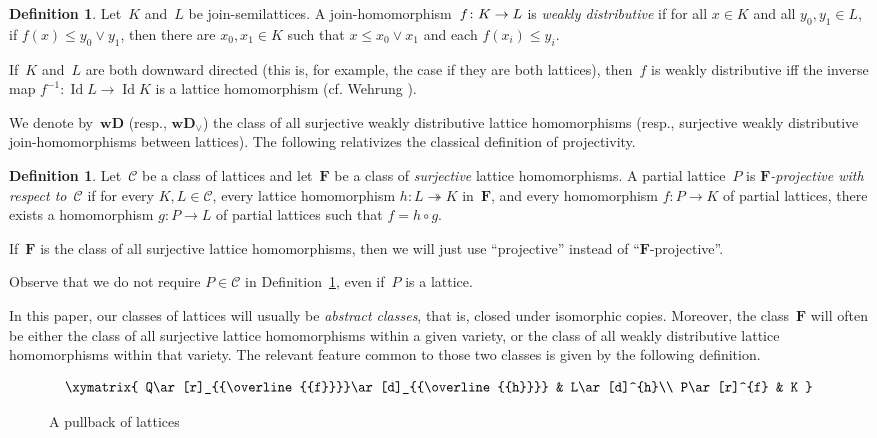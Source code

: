 \documentclass[reqno]{amsart}
\numberwithin{equation}{section}
\theoremstyle{plain}
\theoremstyle{definition}
\newtheorem{definition}[theorem]{Definition}
\theoremstyle{remark}
\numberwithin{figure}{section}
\numberwithin{table}{section}
\begin{document}
\begin{definition}\label{D:WD}
Let~$K$ and~$L$ be {join-semi\-lat\-tice}{s}.
A {join-ho\-mo\-mor\-phism}\ $f\colon K\to\nobreak L$ is \emph{weakly distributive} if for all $x\in K$ and all $y_0,y_1\in L$, if $f(x)\leq y_0\vee y_1$, then there are $x_0,x_1\in K$ such that $x\leq x_0\vee x_1$ and each $f(x_i)\leq y_i$.
\end{definition}

If~$K$ and~$L$ are both downward directed (this is, for example, the case if they are both lattices), then~$f$ is weakly distributive if{f} the inverse map $f^{-1}\colon\operatorname{Id} L\to\operatorname{Id} K$ is a lattice homomorphism (cf. Wehrung \cite[Exercise~7.7]{STA1-7}).

We denote by~${\mathbf{wD}}$ (resp., ${\mathbf{wD}_{\vee}}$) the class of all surjective weakly distributive lattice homomorphisms (resp., surjective weakly distributive {join-ho\-mo\-mor\-phism}{s} between lattices).
The following relativizes the classical definition of projectivity.

\begin{definition}\label{D:Proj}
Let~${\mathcal{C}}$ be a class of lattices and let~${\mathbf{F}}$ be a class of \emph{surjective} lattice homomorphisms.
A partial lattice~$P$ is \emph{${\mathbf{F}}$-projective with respect to~${\mathcal{C}}$} if for every $K,L\in{\mathcal{C}}$, every lattice homomorphism $h\colon L\twoheadrightarrow K$ in~${\mathbf{F}}$, and every homomorphism $f\colon P\to K$ of partial lattices, there exists a homomorphism $g\colon P\to L$ of partial lattices such that $f=h\circ g$.

If~${\mathbf{F}}$ is the class of all surjective lattice homomorphisms, then we will just use ``projective'' instead of ``${\mathbf{F}}$-projective''.
\end{definition}

Observe that we do not require $P\in{\mathcal{C}}$ in Definition~\ref{D:Proj}, even if~$P$ is a lattice.

In this paper, our classes of lattices will usually be \emph{abstract classes}, that is, closed under isomorphic copies.
Moreover, the class~${\mathbf{F}}$ will often be either the class of all surjective lattice homomorphisms within a given variety, or the class of all weakly distributive lattice homomorphisms within that variety.
The relevant feature common to those two classes is given by the following definition.

\begin{figure}[htb]
 \[
 \xymatrix{
 Q\ar[r]_{{\overline{{f}}}}\ar[d]_{{\overline{{h}}}} & L\ar[d]^{h}\\
 P\ar[r]^{f} & K
 }
 \]
\caption{A pullback of lattices}
\label{Fig:Pullback}
\end{figure}
\end{document}
